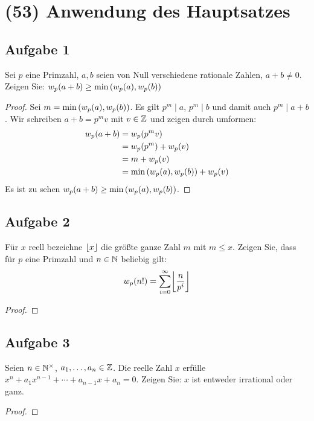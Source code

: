 \section{(53) Anwendung des Hauptsatzes}

\subsection{Aufgabe 1}
Sei $p$ eine Primzahl, $a,b$ seien von Null verschiedene rationale Zahlen,
$a + b \neq 0$. Zeigen Sie: $w_p(a + b) \geq \min{(w_p(a), w_p(b))}$
\begin{proof}
  Sei $m = \min{(w_p(a), w_p(b))}$. Es gilt $p^m \mid a$, $p^m \mid b$
  und damit auch $p^m \mid a + b$. Wir schreiben $a + b = p^{m}v$
  mit $v \in \mathbb{Z}$ und zeigen durch umformen:
  \begin{align*}
    w_p(a + b) & = w_p(p^{m}v)                                                 \\
                             & = w_p(p^m) + w_p(v)                             \\
                             & = m + w_p(v)                                                  \\
                             & = \min{(w_p(a), w_p(b))} + w_p(v)
  \end{align*}
  Es ist zu sehen $w_p(a + b) \geq \min{(w_p(a), w_p(b))}$.
\end{proof}

\subsection{Aufgabe 2}
Für $x$ reell bezeichne $\lfloor x\rfloor$ die größte ganze Zahl $m$ mit $m \leq x$.
Zeigen Sie, dass für $p$ eine Primzahl und $n \in \mathbb{N}$ beliebig gilt:
\begin{equation*}
  \vielfachfunktion{n!} = \sum_{i=0}^{\infty} \floor*{\frac{n}{p^i}}
\end{equation*}
\begin{proof}
\end{proof}

\subsection{Aufgabe 3}
Seien $n \in \mathbb{N}^\times$, $a_1,\dotsc,a_n \in \mathbb{Z}$.
Die reelle Zahl $x$ erfülle $x^n + a_1x^{n-1} + \dotsb + a_{n - 1}x + a_n = 0$.
Zeigen Sie: $x$ ist entweder irrational oder ganz.
\begin{proof}
\end{proof}

